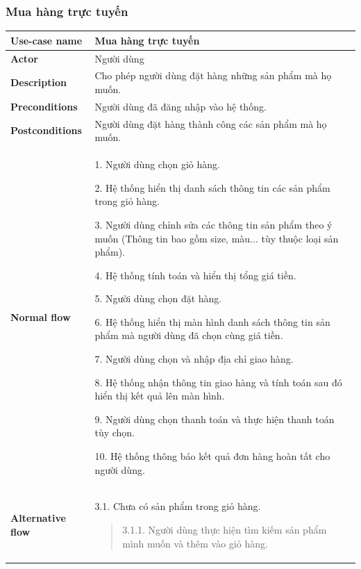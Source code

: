 \subsubsection{Mua hàng trực tuyến }
{
    \setlength\extrarowheight{6pt}
    \begin{longtable}{| p{} | p{} |}
        \hline
        \textbf{Use-case name}
         &
        Mua hàng trực tuyến
        \\
        \hline
        \textbf{Actor}
         &
        Người dùng
        \\
        \hline
        \textbf{Description}
         &
        Cho phép người dùng đặt hàng những sản phẩm mà họ muốn.
        \\
        \hline
        \textbf{Preconditions}
         &
        Người dùng đã đăng nhập vào hệ thống.
        \\
        \hline
        \textbf{Postconditions}
         &
        Người dùng đặt hàng thành công các sản phẩm mà họ muốn.
        \\
        \hline
        \begin{flushleft}
            \textbf{Normal flow}
        \end{flushleft}
         &
        1. Người dùng chọn giỏ hàng.

        2. Hệ thống hiển thị danh sách thông tin các sản phẩm trong giỏ hàng.

        3. Người dùng chỉnh sửa các thông tin sản phẩm theo ý muốn (Thông tin bao gồm size, màu... tùy thuộc loại sản phẩm).

        4. Hệ thống tính toán và hiển thị tổng giá tiền.

        5. Người dùng chọn đặt hàng.

        6. Hệ thống hiển thị màn hình danh sách thông tin sản phẩm mà người dùng đã chọn cùng giá tiền.

        7. Người dùng chọn và nhập địa chỉ giao hàng.

        8. Hệ thống nhận thông tin giao hàng và tính toán sau đó hiển thị kết quả lên màn hình.



        9. Người dùng chọn thanh toán và thực hiện thanh toán tùy chọn.

        10. Hệ thống thông báo kết quả đơn hàng hoàn tất cho người dùng.
        \\
        \hline
        \begin{flushleft}
            \textbf{Alternative flow}
        \end{flushleft}
         &
        3.1. Chưa có sản phẩm trong giỏ hàng.
        \begin{quote}
            3.1.1. Người dùng thực hiện tìm kiếm sản phẩm mình muốn và thêm vào giỏ hàng.


\end{quote}
\end{longtable}}
